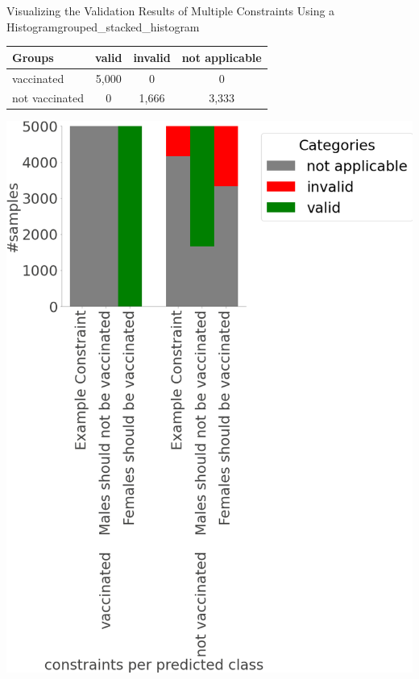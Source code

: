 \begin{Bsp}{Visualizing the Validation Results of Multiple Constraints Using a Histogram}{grouped_stacked_histogram}
   \captionsetup{type=htypei}  
   \begin{minipage}[t]{\linewidth}
        \vspace{1ex}
        \centering
        \begin{tabular}{l|ccc}
            \toprule
             Groups & valid & invalid & not applicable \\
             \midrule
             vaccinated & 5,000 & 0 & 0 \\
             not vaccinated & 0 & 1,666 & 3,333\\
             \bottomrule
        \end{tabular}
        \label{fig:frequency_distribution_table_third_motivating_constraint}
    \end{minipage}
        \captionsetup{type=htypei}
        \begin{minipage}[t]{\linewidth}
            \vspace{1ex}
            \centering
            \includegraphics[scale=.25]{images/visualizations/example_constraints_per_predicted_class.png}    

\end{minipage}
\end{Bsp}

